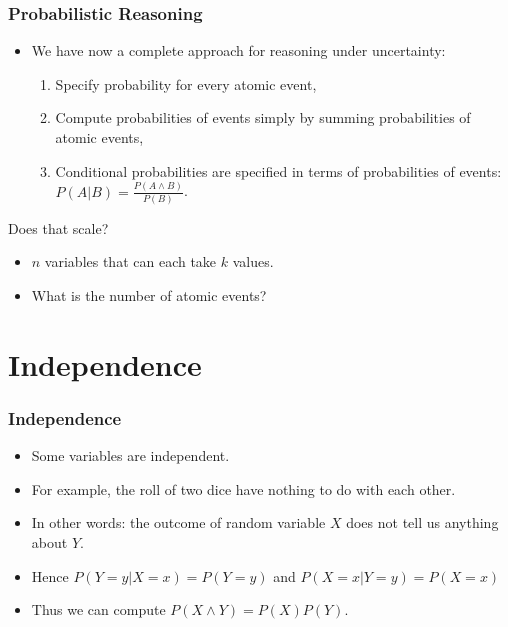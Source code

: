 \documentclass[xcolor=dvipsnames,ignorenonframetext]{beamer}
\begin{document}
\begin{frame}
  \frametitle{Probabilistic Reasoning}
  \begin{itemize}
  \item We have now a complete approach for reasoning under uncertainty:
    \begin{enumerate}
    \item Specify probability for every atomic event,
    \item Compute probabilities of events simply by summing
      probabilities of atomic events,
    \item Conditional probabilities are specified in terms of
      probabilities of events: $P(A | B) = \frac{P(A \wedge B)}{P(B)}$.
    \end{enumerate}
  \end{itemize}
  Does that scale?
  \begin{itemize}
  \item $n$ variables that can each take $k$ values.
  \item What is the number of atomic events?
  \end{itemize}
\end{frame}

\section{Independence}

\begin{frame}
  \frametitle{Independence}
  \begin{itemize}
  \item Some variables are independent.
  \item For example, the roll of two dice have nothing to do with each other.
  \item In other words: the outcome of random variable $X$ does not tell us
    anything about $Y$.
  \item Hence $P(Y=y|X=x)=P(Y=y)$ and $P(X=x|Y=y)=P(X=x)$ 
  \item Thus we can compute $P(X\wedge Y) = P(X)P(Y)$.
  \end{itemize}
\end{frame}
\end{document}
